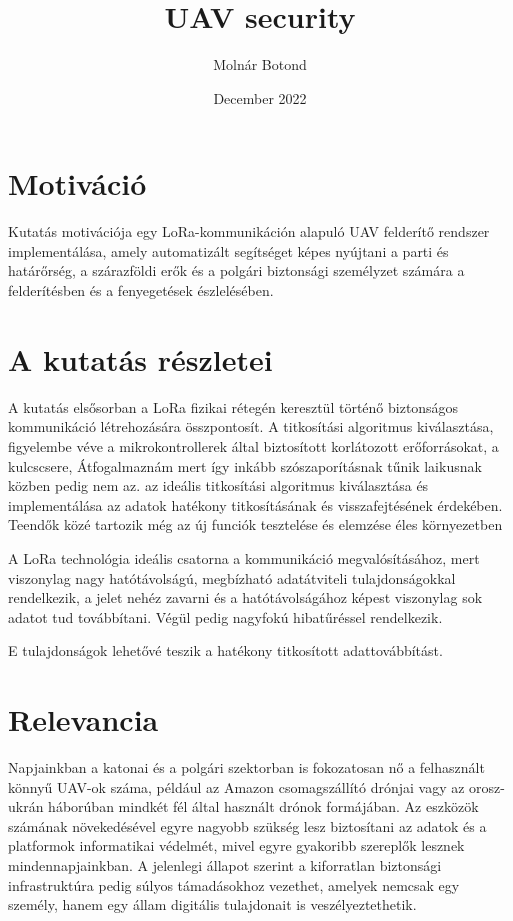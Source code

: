 \documentclass{article}
\title{UAV security}
\author{Molnár Botond}
\date{December 2022}
\begin{document}
\maketitle

\section{Motiváció}

Kutatás motivációja egy LoRa-kommunikáción alapuló UAV felderítő rendszer implementálása, amely automatizált segítséget képes nyújtani a parti és határőrség, a szárazföldi erők és a polgári biztonsági személyzet számára a felderítésben és a fenyegetések észlelésében.

\section{A kutatás részletei}

\begin{flushleft}
A kutatás elsősorban a LoRa fizikai rétegén keresztül történő biztonságos kommunikáció létrehozására összpontosít. A titkosítási algoritmus kiválasztása, figyelembe véve a mikrokontrollerek által biztosított korlátozott erőforrásokat, a kulcscsere, Átfogalmaznám mert így inkább szószaporításnak tűnik laikusnak közben pedig nem az.
az ideális titkosítási algoritmus kiválasztása  és implementálása az adatok hatékony titkosításának és visszafejtésének érdekében.
Teendők közé tartozik még az új funciók tesztelése és elemzése éles környezetben

A LoRa technológia ideális csatorna a kommunikáció megvalósításához, mert viszonylag nagy hatótávolságú, megbízható adatátviteli tulajdonságokkal rendelkezik, a jelet nehéz zavarni és a hatótávolságához képest viszonylag sok adatot tud továbbítani. Végül pedig nagyfokú hibatűréssel rendelkezik.

E tulajdonságok lehetővé teszik a hatékony titkosított adattovábbítást.
\end{flushleft}

\section{Relevancia}

\begin{flushleft}
Napjainkban a katonai és a polgári szektorban is fokozatosan nő a felhasznált könnyű UAV-ok száma, például az Amazon csomagszállító drónjai vagy az orosz-ukrán háborúban mindkét fél által használt drónok formájában. Az eszközök számának növekedésével egyre nagyobb szükség lesz biztosítani az adatok és a platformok informatikai védelmét, mivel egyre gyakoribb szereplők lesznek mindennapjainkban. A jelenlegi állapot szerint a kiforratlan biztonsági infrastruktúra pedig súlyos támadásokhoz vezethet, amelyek nemcsak egy személy, hanem egy állam digitális tulajdonait is veszélyeztethetik.
\end{flushleft}
\end{document}
